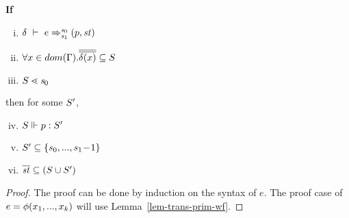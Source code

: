 \begin{thm} \label{thm-trans-wf}
	\textbf{If} 
	\begin{enumerate}[(i)]
		\item $\Trans{\del}{e}{\s_0}{\s_1}{\sfun{p}{\st}}$ 
		\item $\forall x \in dom(\Gam). \olol{\del(x)} \subseteq \S$ 
		\item  $\S \.< \s_0  $
	\end{enumerate}
	then for some $\S'$,
	\begin{enumerate}[(i)]
		\setcounter{enumi} {3}
		\item $\wf{p}{\S}{\S'}$
		\item $\S' \subseteq \{s_0,...,s_1\!-\!1\}$
		\item  $\ol{\st} \subseteq (\S \cup \S')$
	\end{enumerate} 
\end{thm}
\begin{proof}
  The proof  can be done by induction on the syntax of $e$. The proof case of $e= \hcall(x_1,...,x_k)$ will use Lemma~\ref{lem-trans-prim-wf}.
\end{proof}


